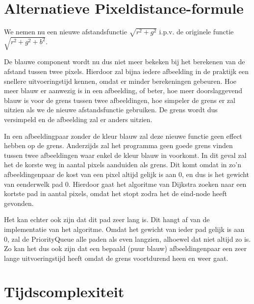 \documentclass{article}
\begin{document}
\newpage
\section{Alternatieve Pixeldistance-formule}
We nemen nu een nieuwe afstandsfunctie $ \sqrt{r^2 + g^2} $ i.p.v. de originele functie $ \sqrt{r^2 + g^2 + b^2} $.

De blauwe component wordt nu dus niet meer bekeken bij het berekenen van de afstand tussen twee pixels. Hierdoor zal bijna iedere
afbeelding in de praktijk een snellere uitvoeringstijd kennen, omdat er minder berekeningen gebeuren. Hoe meer blauw er aanwezig is
in een afbeelding, of beter, hoe meer doorslaggevend blauw is voor de grens tussen twee afbeeldingen, hoe simpeler de grens er zal uitzien
als we de nieuwe afstandsfunctie gebruiken. De grens wordt dus versimpeld en de afbeelding zal er anders uitzien.

In een afbeeldingpaar zonder de kleur blauw zal deze nieuwe functie geen effect hebben op de grens. Anderzijds zal het programma geen goede grens vinden tussen
twee afbeeldingen waar enkel de kleur blauw in voorkomt. In dit geval zal het de korste weg in aantal pixels aanduiden als grens.
Dit komt omdat in zo'n afbeeldingenpaar de kost van een pixel altijd gelijk is aan 0, en dus is het gewicht van eenderwelk pad 0. Hierdoor gaat
het algoritme van Dijkstra zoeken naar een kortste pad in aantal pixels, omdat het stopt zodra het de eind-node heeft gevonden.

Het kan echter ook zijn dat dit pad zeer lang is. Dit hangt af van de implementatie van het algoritme. Omdat het gewicht van ieder pad gelijk
is aan 0, zal de PriorityQueue alle paden als \textquotedbl even lang\textquotedbl  zien, alhoewel dat niet altijd zo is. Zo kan het dus ook zijn dat een bepaald
(puur blauw) afbeeldingenpaar een zeer lange uitvoeringstijd heeft omdat de grens voortdurend heen en weer gaat.

\section{Tijdscomplexiteit}
\end{document}
